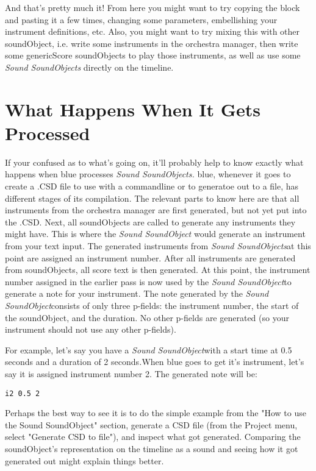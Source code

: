 And that's pretty much it! From here you might want to try copying the
block and pasting it a few times, changing some parameters, embellishing
your instrument definitions, etc. Also, you might want to try mixing
this with other soundObject, i.e. write some instruments in the
orchestra manager, then write some genericScore soundObjects to play
those instruments, as well as use some \emph{Sound SoundObjects}
directly on the timeline.

\section{What Happens When It Gets Processed}

If your confused as to what's going on, it'll probably help to know
exactly what happens when blue processes \emph{Sound SoundObjects.}
blue, whenever it goes to create a .CSD file to use with a commandline
or to generatoe out to a file, has different stages of its compilation.
The relevant parts to know here are that all instruments from the
orchestra manager are first generated, but not yet put into the .CSD.
Next, all soundObjects are called to generate any instruments they might
have. This is where the \emph{Sound SoundObject} would generate an
instrument from your text input. The generated instruments from
\emph{Sound SoundObjects}at this point are assigned an instrument
number. After all instruments are generated from soundObjects, all score
text is then generated. At this point, the instrument number assigned in
the earlier pass is now used by the \emph{Sound SoundObject}to generate
a note for your instrument. The note generated by the \emph{Sound
SoundObject}consists of only three p-fields: the instrument number, the
start of the soundObject, and the duration. No other p-fields are
generated (so your instrument should not use any other p-fields).

For example, let's say you have a \emph{Sound SoundObject}with a start
time at 0.5 seconds and a duration of 2 seconds\emph{.}When blue goes to
get it's instrument, let's say it is assigned instrument number 2. The
generated note will be:

\begin{verbatim}
i2 0.5 2
\end{verbatim}

Perhaps the best way to see it is to do the simple example from the "How
to use the Sound SoundObject" section, generate a CSD file (from the
Project menu, select "Generate CSD to file"), and inspect what got
generated. Comparing the soundObject's representation on the timeline as
a sound and seeing how it got generated out might explain things better.

